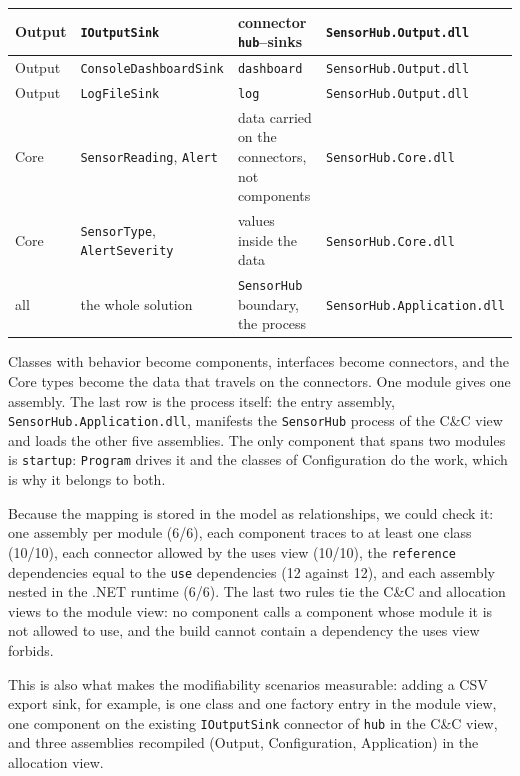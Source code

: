 \documentclass[../main-en.tex]{subfiles}
\begin{document}
\begin{xltabular}{\textwidth}{| l | L | L | l |}
  \hline
  Output & \texttt{IOutputSink} & connector \texttt{hub}--sinks &
  \texttt{SensorHub.Output.dll} \\
  \hline
  Output & \texttt{ConsoleDashboardSink} & \texttt{dashboard} & \texttt{SensorHub.Output.dll} \\
  \hline
  Output & \texttt{LogFileSink} & \texttt{log} & \texttt{SensorHub.Output.dll} \\
  \hline
  Core & \texttt{SensorReading}, \texttt{Alert} & data carried on the
  connectors, not components & \texttt{SensorHub.Core.dll} \\
  \hline
  Core & \texttt{SensorType}, \texttt{AlertSeverity} & values inside the
  data & \texttt{SensorHub.Core.dll} \\
  \hline
  all & the whole solution & \texttt{SensorHub} boundary, the process &
  \texttt{SensorHub.Application.dll} \\
\end{xltabular}
\endgroup

Classes with behavior become components, interfaces become connectors, and
the Core types become the data that travels on the connectors. One module
gives one assembly. The last row is the process itself: the entry assembly,
\texttt{SensorHub.Application.dll}, manifests the
\texttt{SensorHub} process of the C\&C view and loads the other five
assemblies. The only component that spans two modules is \texttt{startup}:
\texttt{Program} drives it and the classes of Configuration do the work,
which is why it belongs to both.

Because the mapping is stored in the model as relationships, we could check
it: one assembly per module (6/6), each component traces to at least one
class (10/10), each connector allowed by the uses view (10/10), the
\texttt{reference} dependencies equal to the \texttt{use} dependencies
(12 against 12), and each assembly nested in the .NET runtime (6/6). The
last two rules tie the C\&C and allocation views to the module view: no
component calls a component whose module it is not allowed to use, and the
build cannot contain a dependency the uses view forbids.

This is also what makes the modifiability scenarios measurable: adding a CSV
export sink, for example, is one class and one factory entry in the module
view, one component on the existing \texttt{IOutputSink} connector of
\texttt{hub} in the C\&C view, and three assemblies recompiled (Output,
Configuration, Application) in the allocation view.

\setcounter{topnumber}{2}
\setcounter{totalnumber}{3}
\renewcommand{\topfraction}{0.7}
\renewcommand{\floatpagefraction}{0.5}
\end{document}
